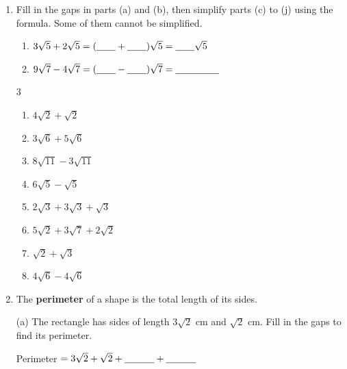 \documentclass[12pt,a4paper]{article}
\newcommand{\ansline}[1][2.2cm]{\underline{\hspace{#1}}}
\newcommand{\gap}{\underline{\hspace{0.7cm}}}
\begin{document}
\begin{enumerate}[resume]

\item Fill in the gaps in parts (a) and (b), then simplify parts (c) to (j)
using the formula. Some of them cannot be simplified.
\begin{enumerate}
  \item $3\sqrt{5}+2\sqrt{5}=(\gap+\gap)\sqrt{5}=\gap\sqrt{5}$
  \item $9\sqrt{7}-4\sqrt{7}=(\gap-\gap)\sqrt{7}=\ansline[1.6cm]$
\end{enumerate}
\vspace{4pt}
\begin{multicols}{3}
\begin{enumerate}[resume]
  \item $4\sqrt{2}+\sqrt{2}$
  \item $3\sqrt{6}+5\sqrt{6}$
  \item $8\sqrt{11}-3\sqrt{11}$
  \item $6\sqrt{5}-\sqrt{5}$
  \item $2\sqrt{3}+3\sqrt{3}+\sqrt{3}$
  \item $5\sqrt{2}+3\sqrt{7}+2\sqrt{2}$
  \item $\sqrt{2}+\sqrt{3}$
  \item $4\sqrt{6}-4\sqrt{6}$
\end{enumerate}
\end{multicols}
\vspace{11em}

\item The \textbf{perimeter} of a shape is the total length of its sides.
\vspace{2pt}

\begin{minipage}[t]{0.48\linewidth}
\raggedright
(a) The rectangle has sides of length $3\sqrt{2}$ cm and $\sqrt{2}$ cm. Fill
in the gaps to find its perimeter.

\vspace{4pt}
\centering
{}

\vspace{8pt}
\raggedright
Perimeter $=3\sqrt{2}+\sqrt{2}+\ansline[1.1cm]+\ansline[1.1cm]$


\end{minipage}
\end{enumerate}
\end{document}
